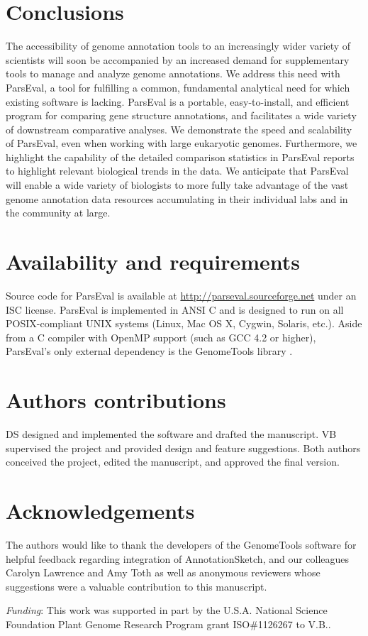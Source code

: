 \section{Conclusions}
The accessibility of genome annotation tools to an increasingly wider variety of scientists will soon be accompanied by an increased demand for supplementary tools to manage and analyze genome annotations.
We address this need with ParsEval, a tool for fulfilling a common, fundamental analytical need for which existing software is lacking.
ParsEval is a portable, easy-to-install, and efficient program for comparing gene structure annotations, and facilitates a wide variety of downstream comparative analyses.
We demonstrate the speed and scalability of ParsEval, even when working with large eukaryotic genomes.
Furthermore, we highlight the capability of the detailed comparison statistics in ParsEval reports to highlight relevant biological trends in the data.
We anticipate that ParsEval will enable a wide variety of biologists to more fully take advantage of the vast genome annotation data resources accumulating in their individual labs and in the community at large.


\section{Availability and requirements}
Source code for ParsEval is available at \url{http://parseval.sourceforge.net} under an ISC license.
ParsEval is implemented in ANSI C and is designed to run on all POSIX-compliant UNIX systems (Linux, Mac OS X, Cygwin, Solaris, etc.).
Aside from a C compiler with OpenMP support (such as GCC 4.2 or higher), ParsEval's only external dependency is the GenomeTools library \citep{genometools}.


\section{Authors contributions}
DS designed and implemented the software and drafted the manuscript.
VB supervised the project and provided design and feature suggestions.
Both authors conceived the project, edited the manuscript, and approved the final version.


\section{Acknowledgements}
The authors would like to thank the developers of the GenomeTools software for helpful feedback regarding integration of AnnotationSketch, and our colleagues Carolyn Lawrence and Amy Toth as well as anonymous reviewers whose suggestions were a valuable contribution to this manuscript.

\emph{Funding}: This work was supported in part by the U.S.A. National Science Foundation Plant Genome Research Program grant ISO\#1126267 to V.B..
